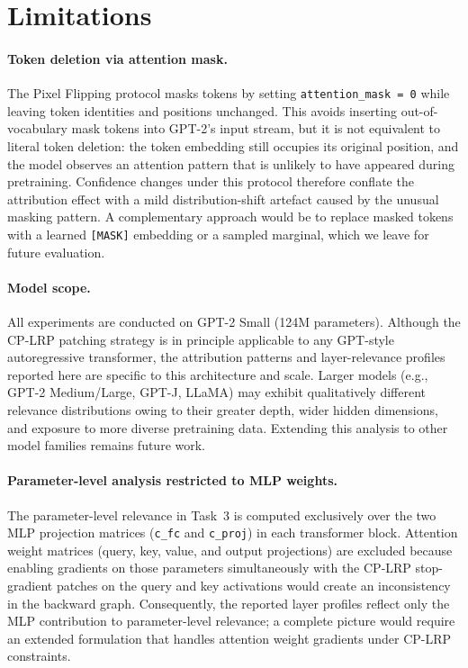 \documentclass[10pt,twocolumn,letterpaper]{article}
\begin{document}
\section{Limitations}
\label{sec:limitations}

\paragraph{Token deletion via attention mask.}
The Pixel Flipping protocol masks tokens by setting \texttt{attention\_mask~=~0}
while leaving token identities and positions unchanged.
This avoids inserting out-of-vocabulary mask tokens into GPT-2's input
stream, but it is not equivalent to literal token deletion: the token
embedding still occupies its original position, and the model observes an
attention pattern that is unlikely to have appeared during pretraining.
Confidence changes under this protocol therefore conflate the attribution
effect with a mild distribution-shift artefact caused by the unusual
masking pattern.
A complementary approach would be to replace masked tokens with a learned
\texttt{[MASK]} embedding or a sampled marginal, which we leave for future
evaluation.

\paragraph{Model scope.}
All experiments are conducted on GPT-2 Small (124M parameters).
Although the CP-LRP patching strategy is in principle applicable to any
GPT-style autoregressive transformer, the attribution patterns and
layer-relevance profiles reported here are specific to this architecture
and scale.
Larger models (e.g., GPT-2 Medium/Large, GPT-J, LLaMA) may exhibit
qualitatively different relevance distributions owing to their greater
depth, wider hidden dimensions, and exposure to more diverse pretraining
data.
Extending this analysis to other model families remains future work.

\paragraph{Parameter-level analysis restricted to MLP weights.}
The parameter-level relevance in Task~3 is computed exclusively over the
two MLP projection matrices (\texttt{c\_fc} and \texttt{c\_proj}) in each
transformer block.
Attention weight matrices (query, key, value, and output projections) are
excluded because enabling gradients on those parameters simultaneously with
the CP-LRP stop-gradient patches on the query and key activations would
create an inconsistency in the backward graph.
Consequently, the reported layer profiles reflect only the MLP contribution
to parameter-level relevance; a complete picture would require an extended
formulation that handles attention weight gradients under CP-LRP constraints.
\end{document}
